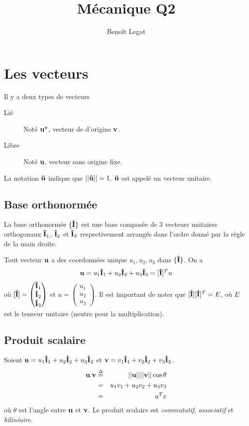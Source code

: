\documentclass[11pt,a4paper]{article} %
\title{Mécanique Q2}
\author{Benoît Legat}
\newcommand\fv[1]{{\bf #1}} %
\newcommand\uv[1]{{\bf\hat{ #1}}} %
\newcommand\ui{{\bf\hat{I}}} %
\newcommand\eqdef{\stackrel{\Delta}{=}}
\begin{document}
\maketitle

\section{Les vecteurs}

Il y a deux types de vecteurs
\begin{description}
	\item[Lié] Noté $\fv{u^v}$, vecteur de d'origine $\fv{v}$.
	\item[Libre] Noté $\fv{u}$, vecteur sans origine fixe.
\end{description}
La notation $\uv{u}$ indique que $||\uv{u}|| = 1$. $\uv{u}$ est appelé un vecteur unitaire.

\subsection{Base orthonormée}

La base orthonormée $\{\ui\}$ est une base composée de 3 vecteurs unitaires orthogonaux $\ui_1$, $\ui_2$ et $\ui_3$ respectivement arrangés dans l'ordre donné par la règle de la main droite.

Tout vecteur $\fv{u}$ a des coordonnées unique $u_1, u_2, u_3$ dans $\{\ui\}$.
On a
\[ \fv{u} = u_1\ui_1 + u_2\ui_2 + u_3\ui_3 = [\ui]^T u \]
	où $[\ui] = \begin{pmatrix}\ui_1\\\ui_2\\\ui_3\end{pmatrix}$ et $u = \begin{pmatrix} u_1 \\ u_2 \\ u_3 \end{pmatrix}$.
Il est important de noter que $[\ui][\ui]^T = E$, où $E$ est le tenseur unitaire (neutre pour la multiplication).

\subsection{Produit scalaire}

Soient $\fv{u} = u_1\ui_1 + u_2\ui_2 + u_3\ui_3$ et $\fv{v} = v_1\ui_1 + v_2\ui_2 + v_3\ui_3$.
\begin{eqnarray*}
	\fv{u}.\fv{v} & \eqdef & ||\fv{u}|| ||\fv{v}|| \cos\theta\\
	& = & u_1v_1 + u_2v_2 + u_3v_3\\
	& = & u^T v
\end{eqnarray*}
où $\theta$ est l'angle entre $\fv{u}$ et $\fv{v}$.
Le produit scalaire est {\em commutatif}, {\em associatif} et {\em bilinéaire}.
\end{document}
